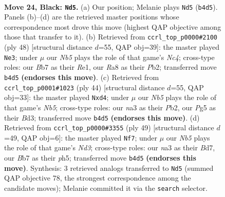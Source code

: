 \documentclass[11pt]{article}
\begin{document}
\clearpage

\begin{figure}[p]\centering
\begin{subfigure}{0.46\textwidth}\centering
\resizebox{\linewidth}{!}{%
\newchessgame
\chessboard[
  setfen={r5k1/pbpp4/1p5p/5pp1/1n6/NPP2PP1/P2PBK1P/R7 b - - 0 24},
  showmover=false,
  pgfstyle=straightmove, color=movearrow, markmove={b4-d5}
]}
\caption{}
\end{subfigure}\hfill
\begin{subfigure}{0.46\textwidth}\centering
\resizebox{\linewidth}{!}{%
\newchessgame
\chessboard[
  setfen={5rk1/p6p/1p2ppp1/3b4/P1N2P2/3P2P1/1P5P/2K1R3 w - - 1 25},
  showmover=false,
  pgfstyle=straightmove, color=movearrow, markmove={c4-e3}
]}
\caption{}
\end{subfigure}
\\[4pt]
\begin{subfigure}{0.46\textwidth}\centering
\resizebox{\linewidth}{!}{%
\newchessgame
\chessboard[
  setfen={r7/p2b1kbp/1p2p1p1/1N2P3/2Pp4/3B4/PP4PP/4R2K w - - 4 23},
  showmover=false,
  pgfstyle=straightmove, color=movearrow, markmove={b5-d4}
]}
\caption{}
\end{subfigure}\hfill
\begin{subfigure}{0.46\textwidth}\centering
\resizebox{\linewidth}{!}{%
\newchessgame
\chessboard[
  setfen={3r1k2/p2b2p1/1ppn1p1p/7P/4PPP1/1PN1KB2/P7/5R2 b - - 6 25},
  showmover=false,
  pgfstyle=straightmove, color=movearrow, markmove={d6-f7}
]}
\caption{}
\end{subfigure}
\caption{\textbf{Move 24, Black: \texttt{Nd5}.} (a) Our position; Melanie plays \texttt{Nd5} (\texttt{b4d5}). Panels (b)--(d) are the retrieved master positions whose correspondence most drove this move (highest QAP objective among those that transfer to it). (b) Retrieved from \texttt{ccrl\_top\_p0000\#2100} (ply 48) [structural distance $d$=55, QAP obj=39]: the master played \texttt{Ne3}; under $\mu$ our \emph{Nb5} plays the role of that game's \emph{Nc4}; cross-type roles: our \emph{B}b7 as their \emph{R}e1, our \emph{R}a8 as their \emph{P}b2; transferred move \texttt{b4d5} \textbf{(endorses this move)}. (c) Retrieved from \texttt{ccrl\_top\_p0001\#1023} (ply 44) [structural distance $d$=55, QAP obj=33]: the master played \texttt{Nxd4}; under $\mu$ our \emph{Nb5} plays the role of that game's \emph{Nb5}; cross-type roles: our \emph{n}a3 as their \emph{P}b2, our \emph{P}g5 as their \emph{B}d3; transferred move \texttt{b4d5} \textbf{(endorses this move)}. (d) Retrieved from \texttt{ccrl\_top\_p0000\#3355} (ply 49) [structural distance $d$=49, QAP obj=6]: the master played \texttt{Nf7}; under $\mu$ our \emph{Nb5} plays the role of that game's \emph{Nd3}; cross-type roles: our \emph{n}a3 as their \emph{B}d7, our \emph{B}b7 as their \emph{p}h5; transferred move \texttt{b4d5} \textbf{(endorses this move)}. Synthesis: 3 retrieved analogs transferred to \texttt{Nd5} (summed QAP objective 78, the strongest correspondence among the candidate moves); Melanie committed it via the \texttt{search} selector.}
\label{fig:thought-m47}
\end{figure}
\end{document}
